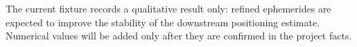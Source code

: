 The current fixture records a qualitative result only: refined ephemerides are expected to improve the stability of the downstream positioning estimate. Numerical values will be added only after they are confirmed in the project facts.
